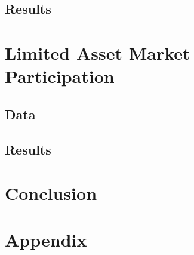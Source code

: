\documentclass{thesis}
\begin{document}
\subsection{Results}

\section{Limited Asset Market Participation}
\subsection{Data}
\subsection{Results}

\section{Conclusion}

\section{Appendix}

\newpage
\let\Section\section 
\def\section*#1{\Section{#1}}


\end{document}
